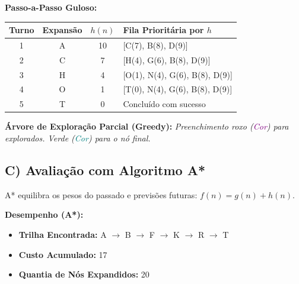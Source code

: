 \textbf{Passo-a-Passo Guloso:}
\begin{table}[h!]
\centering
\small
\begin{tabular}{|c|c|c|l|}
\hline
\textbf{Turno} & \textbf{Expansão} & \textbf{$h(n)$} & \textbf{Fila Prioritária por $h$} \\ \hline
1 & A & 10 & [C(7), B(8), D(9)] \\ \hline
2 & C & 7 & [H(4), G(6), B(8), D(9)] \\ \hline
3 & H & 4 & [O(1), N(4), G(6), B(8), D(9)] \\ \hline
4 & O & 1 & [T(0), N(4), G(6), B(8), D(9)] \\ \hline
5 & T & 0 & Concluído com sucesso \\ \hline
\end{tabular}
\end{table}

\textbf{Árvore de Exploração Parcial (Greedy):}
\textit{Preenchimento roxo (\textcolor{purple}{Cor}) para explorados. Verde (\textcolor{teal}{Cor}) para o nó final.}

\begin{center}
\end{center}

\newpage
\subsection*{C) Avaliação com Algoritmo A*}

A* equilibra os pesos do passado e previsões futuras: $f(n) = g(n) + h(n)$.

\textbf{Desempenho (A*):}
\begin{itemize}
    \item \textbf{Trilha Encontrada:} A $\rightarrow$ B $\rightarrow$ F $\rightarrow$ K $\rightarrow$ R $\rightarrow$ T
    \item \textbf{Custo Acumulado:} 17
    \item \textbf{Quantia de Nós Expandidos:} 20
\end{itemize}

